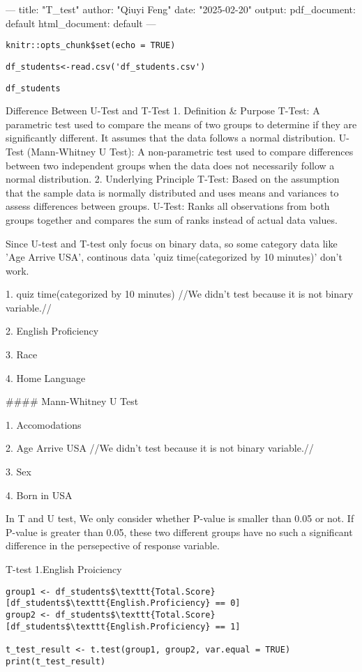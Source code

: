 ---
title: "T_test"
author: "Qiuyi Feng"
date: "2025-02-20"
output:
  pdf_document: default
  html_document: default
---

\begin{verbatim}
knitr::opts_chunk$set(echo = TRUE)
\end{verbatim}

\begin{verbatim}
df_students<-read.csv('df_students.csv')
\end{verbatim}
\begin{verbatim}
df_students
\end{verbatim}
Difference Between U-Test and T-Test
1. Definition & Purpose
T-Test: A parametric test used to compare the means of two groups to determine if they are significantly different. It assumes that the data follows a normal distribution.
U-Test (Mann-Whitney U Test): A non-parametric test used to compare differences between two independent groups when the data does not necessarily follow a normal distribution.
2. Underlying Principle
T-Test: Based on the assumption that the sample data is normally distributed and uses means and variances to assess differences between groups.
U-Test: Ranks all observations from both groups together and compares the sum of ranks instead of actual data values.




Since U-test and T-test only focus on binary data, so some category data like 'Age Arrive USA', continous data 'quiz time(categorized by 10 minutes)' don't work.


1. quiz time(categorized by 10 minutes) //We didn't test because it is not binary variable.//

2. English Proficiency

3. Race

4. Home Language

#### Mann-Whitney U Test

1. Accomodations

2. Age Arrive USA //We didn't test because it is not binary variable.//


3. Sex

4. Born in USA


In T and U test, We only consider whether P-value is smaller than 0.05 or not. If P-value is greater than 0.05, these two different groups have no such a significant difference in the persepective of response variable.

T-test
1.English Proiciency
\begin{verbatim}
group1 <- df_students$\texttt{Total.Score}[df_students$\texttt{English.Proficiency} == 0]
group2 <- df_students$\texttt{Total.Score}[df_students$\texttt{English.Proficiency} == 1]

t_test_result <- t.test(group1, group2, var.equal = TRUE)  
print(t_test_result)
\end{verbatim}

